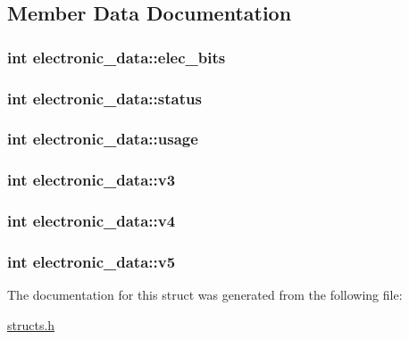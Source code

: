 \subsection{Member Data Documentation}
\hypertarget{structelectronic__data_a23855f2faf03e1ab06b6a8987eba1e5e}{
\subsubsection[{elec\-\_\-bits}]{\setlength{\rightskip}{0pt plus 5cm}int electronic\-\_\-data\-::elec\-\_\-bits}}\label{structelectronic__data_a23855f2faf03e1ab06b6a8987eba1e5e}
\hypertarget{structelectronic__data_ae8da847532cdf8cbdbee95dc201709d2}{
\subsubsection[{status}]{\setlength{\rightskip}{0pt plus 5cm}int electronic\-\_\-data\-::status}}\label{structelectronic__data_ae8da847532cdf8cbdbee95dc201709d2}
\hypertarget{structelectronic__data_a6a551e8806536286f4f2de9a1c97f229}{
\subsubsection[{usage}]{\setlength{\rightskip}{0pt plus 5cm}int electronic\-\_\-data\-::usage}}\label{structelectronic__data_a6a551e8806536286f4f2de9a1c97f229}
\hypertarget{structelectronic__data_aa244c4cfa7aa3ef1e8d9c19c04f1840e}{
\subsubsection[{v3}]{\setlength{\rightskip}{0pt plus 5cm}int electronic\-\_\-data\-::v3}}\label{structelectronic__data_aa244c4cfa7aa3ef1e8d9c19c04f1840e}
\hypertarget{structelectronic__data_a55b8f9b927cd6ecafe1f2d4edc4975c3}{
\subsubsection[{v4}]{\setlength{\rightskip}{0pt plus 5cm}int electronic\-\_\-data\-::v4}}\label{structelectronic__data_a55b8f9b927cd6ecafe1f2d4edc4975c3}
\hypertarget{structelectronic__data_a02993d0044d5ee7eaaf0d40a3531d60e}{
\subsubsection[{v5}]{\setlength{\rightskip}{0pt plus 5cm}int electronic\-\_\-data\-::v5}}\label{structelectronic__data_a02993d0044d5ee7eaaf0d40a3531d60e}


The documentation for this struct was generated from the following file\-:\begin{DoxyCompactItemize}
\item 
\hyperlink{structs_8h}{structs.\-h}\end{DoxyCompactItemize}
